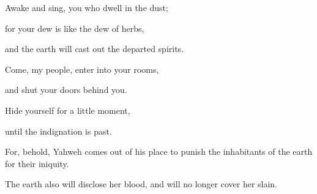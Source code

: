 {\par }{\Q Awake and sing, you who dwell in the dust;
\par }{\QB for your dew is like the dew of herbs,
\par }{\QB and the earth will cast out the departed spirits.
\par }{\BB \par }{\Q {}Come, my people, enter into your rooms,
\par }{\QB and shut your doors behind you.
\par }{\Q Hide yourself for a little moment,
\par }{\QB until the indignation is past.
\par }{\Q {}For, behold, Yahweh comes out of his place to punish the inhabitants of the earth for their iniquity.
\par }{\QB The earth also will disclose her blood, and will no longer cover her slain.

}
